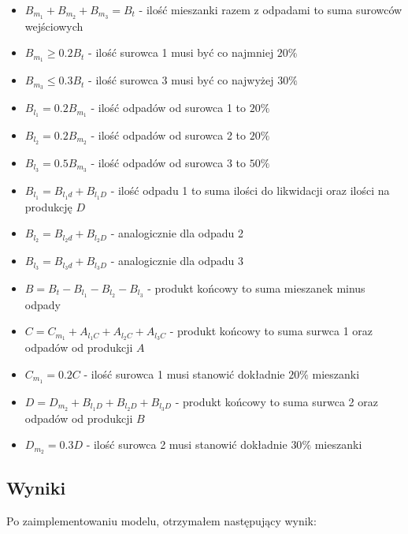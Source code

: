 \documentclass[12pt, a4paper]{article}
\begin{document}
\begin{itemize}
  \item $B_{m_1} + B_{m_2} + B_{m_3} = B_t$ - ilość mieszanki razem z odpadami to suma surowców wejściowych
  \item $B_{m_1} \geq 0.2B_t$ - ilość surowca 1 musi być co najmniej $20\%$
  \item $B_{m_3} \leq 0.3B_t$ - ilość surowca 3 musi być co najwyżej $30\%$
  \item $B_{l_1} = 0.2B_{m_1}$ - ilość odpadów od surowca 1 to $20\%$
  \item $B_{l_2} = 0.2B_{m_2}$ - ilość odpadów od surowca 2 to $20\%$
  \item $B_{l_3} = 0.5B_{m_3}$ - ilość odpadów od surowca 3 to $50\%$
  \item $B_{l_1} = B_{l_1d} + B_{l_1D}$ - ilość odpadu 1 to suma ilości do likwidacji oraz ilości na produkcję $D$ 
  \item $B_{l_2} = B_{l_2d} + B_{l_2D}$ - analogicznie dla odpadu 2
  \item $B_{l_3} = B_{l_3d} + B_{l_3D}$ - analogicznie dla odpadu 3
  \item $B = B_t - B_{l_1} - B_{l_2} - B_{l_3}$ - produkt końcowy to suma mieszanek minus odpady

  \item $C = C_{m_1} + A_{l_1C} + A_{l_2C} + A_{l_3C}$ - produkt końcowy to suma surwca 1 oraz odpadów od produkcji $A$
  \item $C_{m_1} = 0.2C$ - ilość surowca 1 musi stanowić dokładnie $20\%$ mieszanki

  \item $D = D_{m_2} + B_{l_1D} + B_{l_2D} + B_{l_3D}$ - produkt końcowy to suma surwca 2 oraz odpadów od produkcji $B$
  \item $D_{m_2} = 0.3D$ - ilość surowca 2 musi stanowić dokładnie $30\%$ mieszanki
\end{itemize}

\subsection{Wyniki}

Po zaimplementowaniu modelu, otrzymałem następujący wynik:
\end{document}
